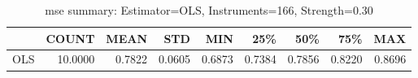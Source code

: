 \begin{table}[ht]
\centering
\caption{mse summary: Estimator=OLS, Instruments=166, Strength=0.30}
\begin{tabular}{lrrrrrrrr}
\toprule
 & COUNT & MEAN & STD & MIN & 25\% & 50\% & 75\% & MAX \\
\midrule
OLS & 10.0000 & 0.7822 & 0.0605 & 0.6873 & 0.7384 & 0.7856 & 0.8220 & 0.8696 \\
\bottomrule
\end{tabular}
\end{table}
